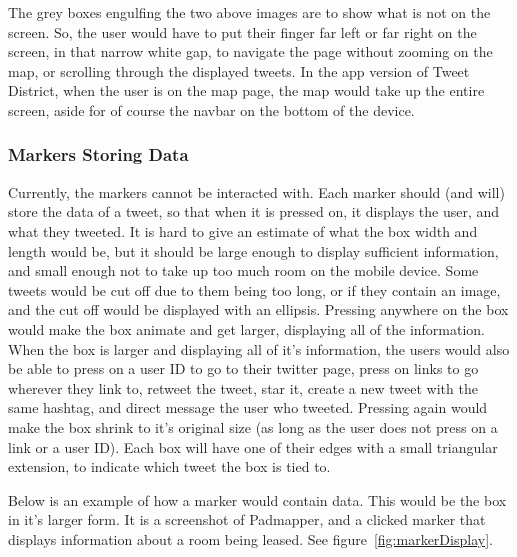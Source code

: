 \documentclass[11pt]{article}
\begin{document}
The grey boxes engulfing the two above images are to show what is not on the screen. So, the user would have to put their finger far left or far right on the screen, in that narrow white gap, to navigate the page without zooming on the map, or scrolling through the displayed tweets. In the app version of Tweet District, when the user is on the map page, the map would take up the entire screen, aside for of course the navbar on the bottom of the device.

\subsubsection{Markers Storing Data}
Currently, the markers cannot be interacted with. Each marker should (and will) store the data of a tweet, so that when it is pressed on, it displays the user, and what they tweeted. It is hard to give an estimate of what the box width and length would be, but it should be large enough to display sufficient information, and small enough not to take up too much room on the mobile device. Some tweets would be cut off due to them being too long, or if they contain an image, and the cut off would be displayed with an ellipsis. Pressing anywhere on the box would make the box animate and get larger, displaying all of the information. When the box is larger and displaying all of it's information, the users would also be able to press on a user ID to go to their twitter page, press on links to go wherever they link to, retweet the tweet, star it, create a new tweet with the same hashtag, and direct message the user who tweeted. Pressing again would make the box shrink to it's original size (as long as the user does not press on a link or a user ID). Each box will have one of their edges with a small triangular extension, to indicate which tweet the box is tied to.

Below is an example of how a marker would contain data. This would be the box in it's larger form. It is a screenshot of Padmapper, and a clicked marker that displays information about a room being leased. See figure~\ref{fig:markerDisplay}.
\end{document}
